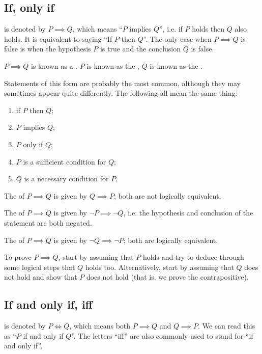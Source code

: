 \subsection{If, only if}
 is denoted by $P \implies Q$, which means ``$P$ implies $Q$'', i.e. if $P$ holds then $Q$ also holds. It is equivalent to saying ``If $P$ then $Q$''. The only case when $P \implies Q$ is false is when the hypothesis $P$ is true and the conclusion $Q$ is false.

$P \implies Q$ is known as a . $P$ is known as the , $Q$ is known as the .

Statements of this form are probably the most common, although they may sometimes appear quite differently. The following all mean the same thing:
\begin{enumerate}[label=(\roman*)]
\item if $P$ then $Q$;
\item $P$ implies $Q$;
\item $P$ only if $Q$;
\item $P$ is a sufficient condition for $Q$;
\item $Q$ is a necessary condition for $P$.
\end{enumerate}

The  of $P \implies Q$ is given by $Q \implies P$; both are not logically equivalent.

The  of $P \implies Q$ is given by $\lnot P \implies \lnot Q$, i.e. the hypothesis and conclusion of the statement are both negated.

The  of $P \implies Q$ is given by $\lnot Q \implies \lnot P$; both are logically equivalent.

To prove $P \implies Q$, start by assuming that $P$ holds and try to deduce through some logical steps that $Q$ holds too. Alternatively, start by assuming that $Q$ does not hold and show that $P$ does not hold (that is, we prove the contrapositive).

\subsection{If and only if, iff}
 is denoted by $P \iff Q$, which means both $P \implies Q$ and $Q \implies P$. We can read this as ``$P$ if and only if $Q$''. The letters ``iff'' are also commonly used to stand for ``if and only if''.


